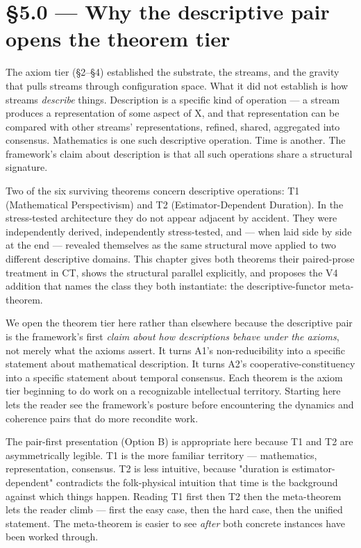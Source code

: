 \documentclass[11pt, openany]{book}
\begin{document}
\section{§5.0 --- Why the descriptive pair opens the theorem tier}

The axiom tier (§2–§4) established the substrate, the streams, and the gravity that pulls streams through configuration space. What it did not establish is how streams \textit{describe} things. Description is a specific kind of operation --- a stream produces a representation of some aspect of X, and that representation can be compared with other streams' representations, refined, shared, aggregated into consensus. Mathematics is one such descriptive operation. Time is another. The framework's claim about description is that all such operations share a structural signature.

Two of the six surviving theorems concern descriptive operations: T1 (Mathematical Perspectivism) and T2 (Estimator-Dependent Duration). In the stress-tested architecture they do not appear adjacent by accident. They were independently derived, independently stress-tested, and --- when laid side by side at the end --- revealed themselves as the same structural move applied to two different descriptive domains. This chapter gives both theorems their paired-prose treatment in CT, shows the structural parallel explicitly, and proposes the V4 addition that names the class they both instantiate: the descriptive-functor meta-theorem.

We open the theorem tier here rather than elsewhere because the descriptive pair is the framework's first \textit{claim about how descriptions behave under the axioms}, not merely what the axioms assert. It turns A1's non-reducibility into a specific statement about mathematical description. It turns A2's cooperative-constituency into a specific statement about temporal consensus. Each theorem is the axiom tier beginning to do work on a recognizable intellectual territory. Starting here lets the reader see the framework's posture before encountering the dynamics and coherence pairs that do more recondite work.

The pair-first presentation (Option B) is appropriate here because T1 and T2 are asymmetrically legible. T1 is the more familiar territory --- mathematics, representation, consensus. T2 is less intuitive, because "duration is estimator-dependent" contradicts the folk-physical intuition that time is the background against which things happen. Reading T1 first then T2 then the meta-theorem lets the reader climb --- first the easy case, then the hard case, then the unified statement. The meta-theorem is easier to see \textit{after} both concrete instances have been worked through.
\end{document}
